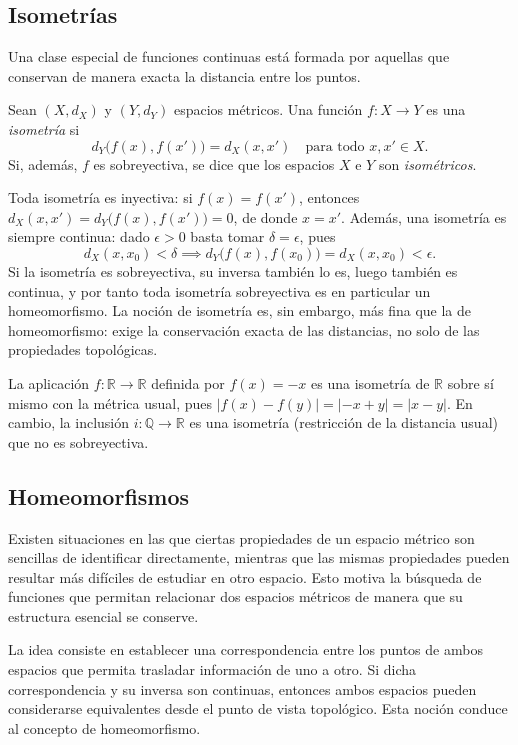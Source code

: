 \subsection{Isometrías}

Una clase especial de funciones continuas está formada por aquellas que conservan de manera exacta la distancia entre los puntos.

\begin{definition}
\label{def:isometria}
Sean $(X,d_X)$ y $(Y,d_Y)$ espacios métricos. Una función $f\colon X\to Y$ es una \emph{isometría} si
\[
  d_Y\bigl(f(x),f(x')\bigr)=d_X(x,x')\quad\text{para todo }x,x'\in X.
\]
Si, además, $f$ es sobreyectiva, se dice que los espacios $X$ e $Y$ son \emph{isométricos}.
\end{definition}

Toda isometría es inyectiva: si $f(x)=f(x')$, entonces $d_X(x,x')=d_Y\bigl(f(x),f(x')\bigr)=0$, de donde $x=x'$. Además, una isometría es siempre continua: dado $\epsilon>0$ basta tomar $\delta=\epsilon$, pues
\[
  d_X(x,x_0)<\delta\implies d_Y\bigl(f(x),f(x_0)\bigr)=d_X(x,x_0)<\epsilon.
\]
Si la isometría es sobreyectiva, su inversa también lo es, luego también es continua, y por tanto toda isometría sobreyectiva es en particular un homeomorfismo. La noción de isometría es, sin embargo, más fina que la de homeomorfismo: exige la conservación exacta de las distancias, no solo de las propiedades topológicas.

\begin{example}
La aplicación $f\colon\mathbb{R}\to\mathbb{R}$ definida por $f(x)=-x$ es una isometría de $\mathbb{R}$ sobre sí mismo con la métrica usual, pues $|f(x)-f(y)|=|-x+y|=|x-y|$. En cambio, la inclusión $i\colon\mathbb{Q}\to\mathbb{R}$ es una isometría (restricción de la distancia usual) que no es sobreyectiva.
\end{example}

\subsection{Homeomorfismos}

Existen situaciones en las que ciertas propiedades de un espacio
métrico son sencillas de identificar directamente, mientras que las
mismas propiedades pueden resultar más difíciles de estudiar en otro
espacio. Esto motiva la búsqueda de funciones que permitan relacionar
dos espacios métricos de manera que su estructura esencial se conserve.

La idea consiste en establecer una correspondencia entre los puntos de
ambos espacios que permita trasladar información de uno a otro. Si
dicha correspondencia y su inversa son continuas, entonces ambos
espacios pueden considerarse equivalentes desde el punto de vista
topológico. Esta noción conduce al concepto de homeomorfismo.

